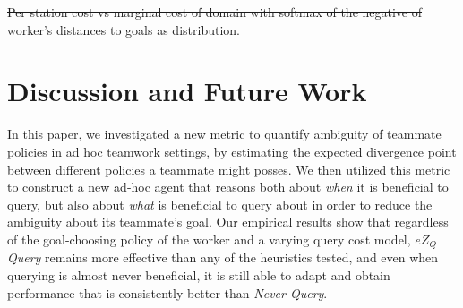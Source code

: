 \documentclass[letterpaper]{article}
\providecommand{\DIFdeltex}[1]{{\protect\color{red}\sout{#1}}}                      %
\providecommand{\DIFdelbegin}{} %
\providecommand{\DIFdelend}{} %
\providecommand{\DIFdelFL}[1]{\DIFdel{#1}} %
\providecommand{\DIFdel}[1]{\texorpdfstring{\DIFdeltex{#1}}{}} %
\newcommand{\DIFscaledelfig}{0.5}
\newlength{\DIFdelgraphicswidth} %
\newlength{\DIFdelgraphicsheight} %
\newcommand{\DIFdelincludegraphics}[2][]{%
\sbox{\DIFdelgraphicsbox}{\DIFOincludegraphics[#1]{#2}}%
\settoboxwidth{\DIFdelgraphicswidth}{\DIFdelgraphicsbox} %
\settoboxtotalheight{\DIFdelgraphicsheight}{\DIFdelgraphicsbox} %
\scalebox{\DIFscaledelfig}{%
\parbox[b]{\DIFdelgraphicswidth}{\usebox{\DIFdelgraphicsbox}\\[-\baselineskip] \rule{\DIFdelgraphicswidth}{0em}}\llap{\resizebox{\DIFdelgraphicswidth}{\DIFdelgraphicsheight}{%
\setlength{\unitlength}{\DIFdelgraphicswidth}%
\begin{picture}(1,1)%
\thicklines\linethickness{2pt} %
{\color[rgb]{1,0,0}\put(0,0){\framebox(1,1){}}}%
{\color[rgb]{1,0,0}\put(0,0){\line( 1,1){1}}}%
{\color[rgb]{1,0,0}\put(0,1){\line(1,-1){1}}}%
\end{picture}%
}\hspace*{3pt}}} %
} %
\DeclareRobustCommand{\DIFdelbegin}{\DIFOdelbegin \let\includegraphics\DIFdelincludegraphics} %
\DeclareRobustCommand{\DIFdelend}{\DIFOaddend \let\includegraphics\DIFOincludegraphics} %
\begin{document}
\DIFdelbegin %
{%
\DIFdelFL{Per station cost vs marginal cost of domain with softmax of the negative of worker's distances to goals as distribution.}}

\DIFdelend %


\section{Discussion and Future Work}
In this paper, we investigated a new metric to quantify ambiguity of teammate policies in ad hoc teamwork settings, by estimating the expected divergence point between different policies a teammate might posses. We then utilized this metric to construct a new ad-hoc agent that reasons both about \emph{when} it is beneficial to query, but also about \emph{what} is beneficial to query about in order to reduce the ambiguity about its teammate's goal. Our empirical results show that regardless of the goal-choosing policy of the worker and a varying query cost model, \emph{$eZ_Q$ Query} remains more effective than any of the heuristics tested, and even when querying is almost never beneficial, it is still able to adapt and obtain performance that is consistently better than \emph{Never Query}.
\end{document}

